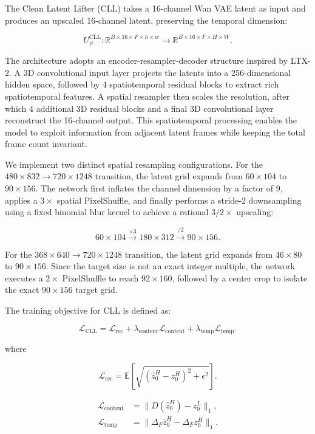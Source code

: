 The Clean Latent Lifter (CLL) takes a 16-channel Wan VAE latent as input
and produces an upscaled 16-channel latent, preserving the temporal
dimension:

\[
U_\psi^{\mathrm{CLL}}:\mathbb{R}^{B\times16\times F\times h\times w}
\rightarrow \mathbb{R}^{B\times16\times F\times H\times W}.
\]

The architecture adopts an encoder-resampler-decoder structure inspired
by LTX-2. A 3D convolutional input layer projects the latents into a
256-dimensional hidden space, followed by 4 spatiotemporal residual
blocks to extract rich spatiotemporal features. A spatial resampler then
scales the resolution, after which 4 additional 3D residual blocks and a
final 3D convolutional layer reconstruct the 16-channel output. This
spatiotemporal processing enables the model to exploit information from
adjacent latent frames while keeping the total frame count invariant.

We implement two distinct spatial resampling configurations. For the
\(480\times832 \rightarrow 720\times1248\) transition, the latent grid
expands from \(60\times104\) to \(90\times156\). The network first
inflates the channel dimension by a factor of 9, applies a \(3\times\)
spatial PixelShuffle, and finally performs a stride-2 downsampling using
a fixed binomial blur kernel to achieve a rational \(3/2\times\)
upscaling:

\[
60\times104 \xrightarrow{\times3} 180\times312
\xrightarrow{/2} 90\times156.
\]

For the \(368\times640 \rightarrow 720\times1248\) transition, the
latent grid expands from \(46\times80\) to \(90\times156\). Since the
target size is not an exact integer multiple, the network executes a
\(2\times\) PixelShuffle to reach \(92\times160\), followed by a center
crop to isolate the exact \(90\times156\) target grid.

The training objective for CLL is defined as:

\[
\mathcal L_{\mathrm{CLL}}=\mathcal L_{\mathrm{rec}}
+\lambda_{\mathrm{content}}\mathcal L_{\mathrm{content}}
+\lambda_{\mathrm{temp}}\mathcal L_{\mathrm{temp}}.
\]

where

\[
\mathcal L_{\mathrm{rec}}
=\mathbb E\left[\sqrt{(\widehat z_0^H-z_0^H)^2+\epsilon^2}\right].
\]

\begin{align}
\mathcal L_{\mathrm{content}}
&=\lVert D(\widehat z_0^H)-z_0^L\rVert_1,\\
\mathcal L_{\mathrm{temp}}
&=\lVert\Delta_F\widehat z_0^H-\Delta_Fz_0^H\rVert_1.
\end{align}

